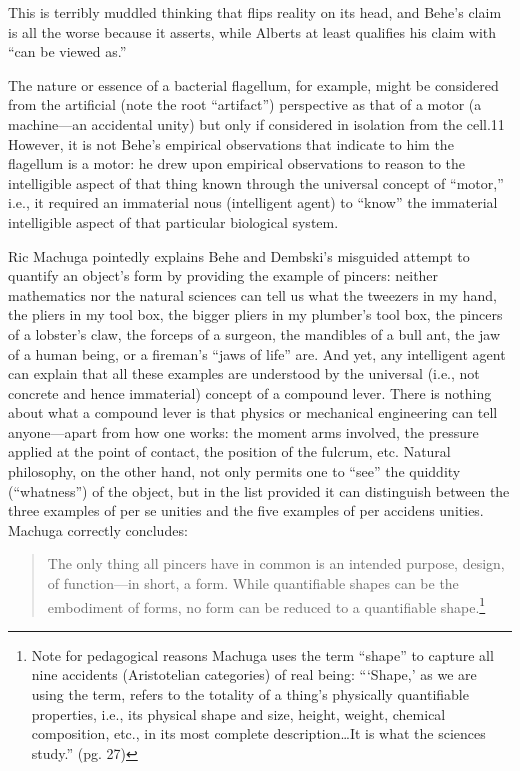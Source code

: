 This is terribly muddled thinking that flips reality on its head, and Behe’s claim is all the worse because it asserts, while Alberts at least qualifies his claim with ``can be viewed as.''

The nature or essence of a bacterial flagellum, for example, might be considered from the artificial (note the root ``artifact'') perspective as that of a motor (a machine---an accidental unity) but only if considered in isolation from the cell.11 However, it is not Behe’s empirical observations that indicate to him the flagellum is a motor: he drew upon empirical observations to reason to the intelligible aspect of that thing known through the universal concept of ``motor,'' i.e., it required an immaterial nous (intelligent agent) to ``know'' the immaterial intelligible aspect of that particular biological system.

Ric Machuga pointedly explains Behe and Dembski’s misguided attempt to quantify an object’s form by providing the example of pincers: neither mathematics nor the natural sciences can tell us what the tweezers in my hand, the pliers in my tool box, the bigger pliers in my plumber’s tool box, the pincers of a lobster’s claw, the forceps of a surgeon, the mandibles of a bull ant, the jaw of a human being, or a fireman’s ``jaws of life'' are. And yet, any intelligent agent can explain that all these examples are understood by the universal (i.e., not concrete and hence immaterial) concept of a compound lever. There is nothing about what a compound lever is that physics or mechanical engineering can tell anyone---apart from how one works: the moment arms involved, the pressure applied at the point of contact, the position of the fulcrum, etc. Natural philosophy, on the other hand, not only permits one to ``see'' the quiddity (``whatness'') of the object, but in the list provided it can distinguish between the three examples of per se unities and the five examples of per accidens unities. Machuga correctly concludes:

\begin{quote}
The only thing all pincers have in common is an intended purpose, design, of function---in short, a form. While quantifiable shapes can be the embodiment of forms, no form can be reduced to a quantifiable shape.\cite[pg.~162]{machuga}\footnote{Note for pedagogical reasons Machuga uses the term ``shape'' to capture all nine accidents (Aristotelian categories) of real being: ``‘Shape,’ as we are using the term, refers to the totality of a thing’s physically quantifiable properties, i.e., its physical shape and size, height, weight, chemical composition, etc., in its most complete description\ldots It is what the sciences study.'' (pg. 27)}
\end{quote}

